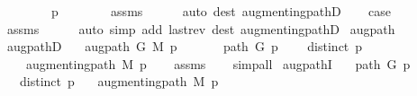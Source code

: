 \begin{isabellebody}
\isamarkupfalse%
\isanewline
\ \ \isamarkupfalse%
\ {}\isanewline
\ \ \isamarkupfalse%
\ {\isachardoublequoteopen}p\ {\isasymnoteq}\ {\isacharbrackleft}{\kern0pt}{\isacharbrackright}{\kern0pt}{\isachardoublequoteclose}\isanewline
\ \ \ \ \isamarkupfalse%
\ assms\isanewline
\ \ \ \ \isamarkupfalse%
\ {\isacharparenleft}{\kern0pt}auto\ dest{\isacharcolon}{\kern0pt}\ augmenting{\isacharunderscore}{\kern0pt}pathD{\isacharparenleft}{\kern0pt}{}{\isacharparenright}{\kern0pt}{\isacharparenright}{\kern0pt}\isanewline
\ \ \isamarkupfalse%
\ {\isacharquery}{\kern0pt}case\isanewline
\ \ \ \ \isamarkupfalse%
\ assms\isanewline
\ \ \ \ \isamarkupfalse%
\ {\isacharparenleft}{\kern0pt}auto\ simp\ add{\isacharcolon}{\kern0pt}\ last{\isacharunderscore}{\kern0pt}rev\ dest{\isacharcolon}{\kern0pt}\ augmenting{\isacharunderscore}{\kern0pt}pathD{\isacharparenleft}{\kern0pt}{}{\isacharparenright}{\kern0pt}{\isacharparenright}{\kern0pt}\isanewline
{}\isamarkupfalse%
%
\endisatagproof
{\isafoldproof}%
%
\isadelimproof
\isanewline
%
\endisadelimproof
%
\isadeliminvisible
\isanewline
%
\endisadeliminvisible
%
\isataginvisible
{}\isamarkupfalse%
\ augpath\isanewline
{}\isamarkupfalse%
\ augpathD{\isacharcolon}{\kern0pt}\isanewline
\ \ \ {\isachardoublequoteopen}augpath\ G\ M\ p{\isachardoublequoteclose}\isanewline
\ \ \isanewline
\ \ \ \ {\isachardoublequoteopen}path\ G\ p{\isachardoublequoteclose}\isanewline
\ \ \ \ {\isachardoublequoteopen}distinct\ p{\isachardoublequoteclose}\isanewline
\ \ \ \ {\isachardoublequoteopen}augmenting{\isacharunderscore}{\kern0pt}path\ M\ p{\isachardoublequoteclose}%
\endisataginvisible
{\isafoldinvisible}%
%
\isadeliminvisible
\isanewline
%
\endisadeliminvisible
%
\isadelimproof
\ \ %
\endisadelimproof
%
\isatagproof
{}\isamarkupfalse%
\ assms\isanewline
\ \ \isamarkupfalse%
\ simp{\isacharunderscore}{\kern0pt}all%
\endisatagproof
{\isafoldproof}%
%
\isadelimproof
\isanewline
%
\endisadelimproof
%
\isadeliminvisible
\isanewline
%
\endisadeliminvisible
%
\isataginvisible
{}\isamarkupfalse%
\ augpathI{\isacharcolon}{\kern0pt}\isanewline
\ \ \ {\isachardoublequoteopen}path\ G\ p{\isachardoublequoteclose}\isanewline
\ \ \ {\isachardoublequoteopen}distinct\ p{\isachardoublequoteclose}\isanewline
\ \ \ {\isachardoublequoteopen}augmenting{\isacharunderscore}{\kern0pt}path\ M\ p{\isachardoublequoteclose}\isanewline

\end{isabellebody}
